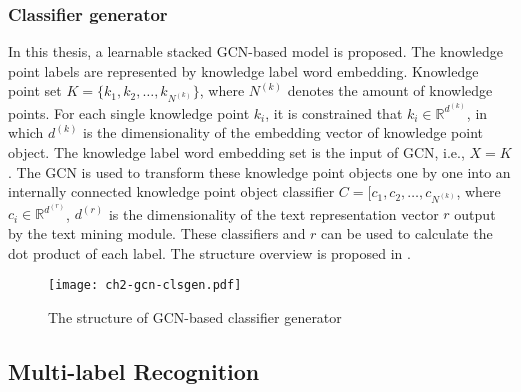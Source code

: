 \subsubsection{Classifier generator}


In this thesis, a learnable stacked GCN-based model is proposed. The knowledge point labels are represented by knowledge label word embedding. Knowledge point set \(K=\{k_1,k_2,\ldots,k_{N^{(k)}}\} \), where \(N^{(k)}\) denotes the amount of knowledge points. For each single knowledge point \(k_i\), it is constrained that \(k_i \in \mathbb{R}^ {d^{(k)}}\), in which \(d^{(k)}\) is the dimensionality of the embedding vector of knowledge point object. The knowledge label word embedding set is the input of GCN, i.e., \(X = K\). The GCN is used to transform these knowledge point objects one by one into an internally connected knowledge point object classifier \(C=[c_1,c_2,\ldots,c_{N^{(k)}}\), where \(c_i \in \mathbb {R}^{d^{(r)}}\), \(d^{(r)}\) is the dimensionality of the text representation vector \(r\) output by the text mining module. These classifiers and \(r\) can be used to calculate the dot product of each label. The structure overview is proposed in \figname{\ref{fig:ch2-gcn-clsgen}}.

\begin{figure}[htbp!]
    \centering
    \texttt{[image: ch2-gcn-clsgen.pdf]}
    \caption{The structure of GCN-based classifier generator}\label{fig:ch2-gcn-clsgen}
\end{figure}

\subsection{Multi-label Recognition}

